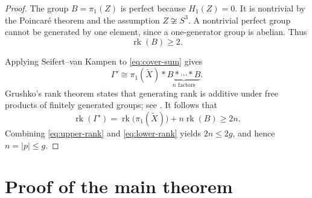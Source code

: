 \documentclass[11pt]{article}
\DeclareMathOperator{\rk}{rk}
\begin{document}
\begin{proof}
The group \(B=\pi_1(Z)\) is perfect because \(H_1(Z)=0\).
It is nontrivial by the Poincar\'e theorem and the assumption
\(Z\not\cong S^3\). A nontrivial perfect group cannot be generated by
one element, since a one-generator group is abelian. Thus
\[
    \rk(B)\geq 2.
\]

Applying Seifert--van Kampen to \eqref{eq:cover-sum} gives
\[
    \Gamma'\cong
    \pi_1(\widetilde X)*
    \underbrace{B*\cdots*B}_{n\text{ factors}}.
\]
Grushko's rank theorem states that generating rank is additive under
free products of finitely generated groups; see \cite{Stallings}. 
It follows that
\begin{equation}\label{eq:lower-rank}
    \rk(\Gamma')
      =\rk\bigl(\pi_1(\widetilde X)\bigr)+n\rk(B)
      \geq 2n.
\end{equation}
Combining \eqref{eq:upper-rank} and \eqref{eq:lower-rank} yields
\(2n\leq 2g\), and hence \(n=|p|\leq g\).
\end{proof}

\section{Proof of the main theorem}
\end{document}
